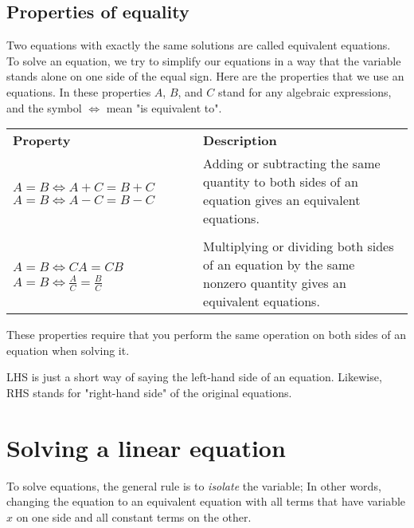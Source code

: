 \subsection{Properties of equality}
Two equations with exactly the same solutions are called equivalent equations. \\
To solve an equation,  we try to simplify our equations in a way that the variable stands alone on one side of the equal sign. Here are the properties that we use an equations. In these properties $A$, $B$, and $C$ stand for any algebraic expressions, and the symbol $\Longleftrightarrow$ mean "is equivalent to".
\begin{tcolorbox}[title=Properties of Equality,
                    fonttitle=\bfseries,
                    colframe=blue!70!red,
                    colback=white]
\begin{tabularx}{\textwidth}{XX}
    \textbf{Property} & \textbf{Description}\\
    {$A=B \Longleftrightarrow A+C=B+C$ \newline~\newline
       $A=B \Longleftrightarrow A-C=B-C$ }
    &   Adding or subtracting the same quantity to both sides of an equation gives an equivalent equations. \\
     & \\
    {$A=B \Longleftrightarrow CA=CB$ \newline~\newline
     $\displaystyle A=B \Longleftrightarrow \frac{A}{C}=\frac{B}{C}$
     }& Multiplying or dividing both sides of an equation by the same nonzero quantity gives an equivalent equations.
\end{tabularx}
\end{tcolorbox}
\begin{nt}
    These properties require that you perform the same operation on both sides of an equation when solving it.  
\end{nt}
\begin{nt}
    LHS is just a short way of saying the left-hand side of an equation. Likewise, RHS stands for "right-hand side" of the original equations.
\end{nt}
\section{Solving a linear equation}
To solve equations, the general rule is to \textit{isolate} the variable; In other words, changing the equation to an equivalent equation with all terms that have variable $x$ on one side and all constant terms on the other.


